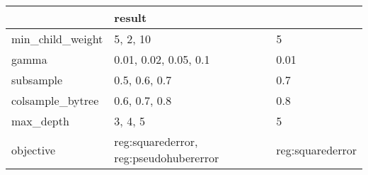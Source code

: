 \begin{tabular}{lll}
\toprule
{} &            result \\
\midrule
min\_child\_weight &                                5, 2, 10 &                 5 \\
gamma            &                   0.01, 0.02, 0.05, 0.1 &              0.01 \\
subsample        &                           0.5, 0.6, 0.7 &               0.7 \\
colsample\_bytree &                           0.6, 0.7, 0.8 &               0.8 \\
max\_depth        &                                 3, 4, 5 &                 5 \\
objective        &  reg:squarederror, reg:pseudohubererror &  reg:squarederror \\
\bottomrule
\end{tabular}
